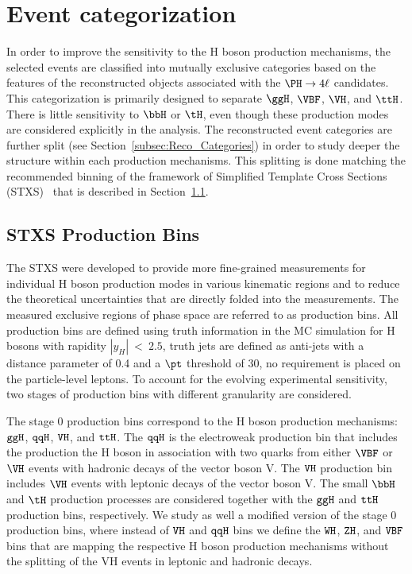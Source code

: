\section{Event categorization}
\label{sec:categorization}

In order to improve the sensitivity to the H boson production mechanisms,
the selected events are classified into mutually exclusive categories based on the features of the reconstructed objects associated with the $\PH\to4\ell$ candidates.
This categorization is primarily designed to separate $\ggH$, $\VBF$, $\VH$, and $\ttH$.
There is little sensitivity to $\bbH$ or $\tH$, even though these production modes are considered explicitly in the analysis.
The reconstructed event categories are further split (see Section~\ref{subsec:Reco_Categories}) in order to study deeper the structure within each production mechanisms.
This splitting is done matching the recommended binning of the framework of Simplified Template Cross Sections (STXS)~\cite{Bendavid:2018nar,YR4,Berger:2019wnu} that is described in Section~\ref{subsec:STXS_Categories}.

\subsection{STXS Production Bins}
\label{subsec:STXS_Categories}

The STXS were developed to provide more fine-grained measurements for individual H boson production modes in various kinematic regions and to reduce the theoretical uncertainties that are directly folded into the measurements.
The measured exclusive regions of phase space are referred to as production bins.
All production bins are defined using truth information in the MC simulation for H bosons with rapidity $|y_H|~<~2.5$, truth jets are defined as anti-\kt jets with a distance parameter of 0.4 and a $\pt$ threshold of 30\GeV, no requirement is placed on the particle-level leptons.
To account for the evolving experimental sensitivity, two stages of production bins with different granularity are considered.

The stage 0 production bins correspond to the H boson production mechanisms: $\tt ggH$, $\tt qqH$, $\tt VH$, and $\tt ttH$.
The $\tt qqH$ is the electroweak production bin that includes the production the H boson in association with two quarks from either $\VBF$ or $\VH$ events with hadronic decays of the vector boson V.
The $\tt VH$ production bin includes $\VH$ events with leptonic decays of the vector boson V.
The small $\bbH$ and $\tH$ production processes are considered together with the $\tt ggH$ and $\tt ttH$ production bins, respectively.
We study as well a modified version of the stage 0 production bins, where instead of $\tt VH$ and $\tt qqH$ bins we define the $\tt WH$, $\tt ZH$, and $\tt VBF$ bins that are mapping the respective H boson production mechanisms without the splitting of the VH events in leptonic and hadronic decays.

